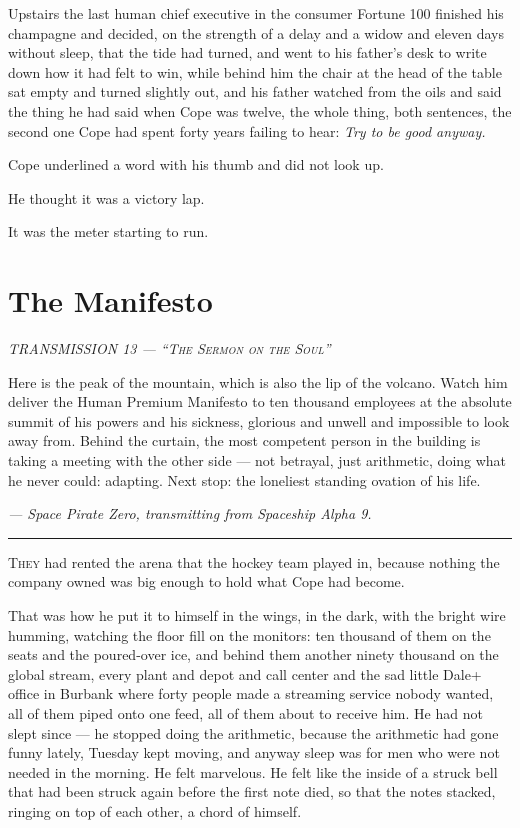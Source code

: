 \documentclass[11pt,openany]{book}
\newcommand{\transheader}{\normalfont\footnotesize\scshape\letterspace}
\newcommand{\letterspace}{}
\newenvironment{transmission}{%
  \par\vspace{0.3\baselineskip}\begin{center}\begin{minipage}{0.88\textwidth}%
  \itshape\small\setlength{\parindent}{0pt}\setstretch{1.06}}%
  {\end{minipage}\end{center}\vspace{0.4\baselineskip}%
  \noindent\hfil\rule{0.35\textwidth}{0.3pt}\hfil\par\vspace{1.0\baselineskip}}
\begin{document}
Upstairs the last human chief executive in the consumer Fortune 100 finished his champagne and decided, on the strength of a delay and a widow and eleven days without sleep, that the tide had turned, and went to his father's desk to write down how it had felt to win, while behind him the chair at the head of the table sat empty and turned slightly out, and his father watched from the oils and said the thing he had said when Cope was twelve, the whole thing, both sentences, the second one Cope had spent forty years failing to hear: \textit{Try to be good anyway.}

Cope underlined a word with his thumb and did not look up.

He thought it was a victory lap.

It was the meter starting to run.

\clearpage
\chapter{The Manifesto}

\begin{transmission}
{\transheader TRANSMISSION 13 --- ``The Sermon on the Soul''}\par\vspace{0.5em}
Here is the peak of the mountain, which is also the lip of the volcano. Watch him deliver the Human Premium Manifesto to ten thousand employees at the absolute summit of his powers and his sickness, glorious and unwell and impossible to look away from. Behind the curtain, the most competent person in the building is taking a meeting with the other side --- not betrayal, just arithmetic, doing what he never could: adapting. Next stop: the loneliest standing ovation of his life.\par
\vspace{0.5em}\hfill\textit{--- Space Pirate Zero, transmitting from Spaceship Alpha 9.}\par
\end{transmission}


\lettrine[lines=3, lhang=0.05, nindent=0.25em]{T}{hey} had rented the arena that the hockey team played in, because nothing the company owned was big enough to hold what Cope had become.

That was how he put it to himself in the wings, in the dark, with the bright wire humming, watching the floor fill on the monitors: ten thousand of them on the seats and the poured-over ice, and behind them another ninety thousand on the global stream, every plant and depot and call center and the sad little Dale+ office in Burbank where forty people made a streaming service nobody wanted, all of them piped onto one feed, all of them about to receive him. He had not slept since --- he stopped doing the arithmetic, because the arithmetic had gone funny lately, Tuesday kept moving, and anyway sleep was for men who were not needed in the morning. He felt marvelous. He felt like the inside of a struck bell that had been struck again before the first note died, so that the notes stacked, ringing on top of each other, a chord of himself.
\end{document}
